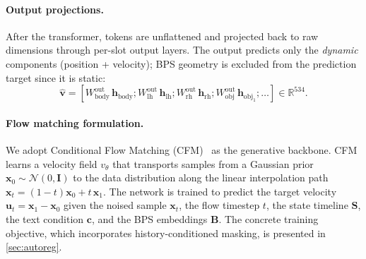 \documentclass[sigconf, screen, review, anonymous]{acmart}
\begin{document}
\paragraph{Output projections.}
After the transformer, tokens are unflattened and projected back to raw dimensions through per-slot output layers. The output predicts only the \emph{dynamic} components (position + velocity); BPS geometry is excluded from the prediction target since it is static:
\begin{equation}
    \hat{\mathbf{v}} = [W_{\text{body}}^{\text{out}}\,\mathbf{h}_{\text{body}}; W_{\text{lh}}^{\text{out}}\,\mathbf{h}_{\text{lh}}; W_{\text{rh}}^{\text{out}}\,\mathbf{h}_{\text{rh}}; W_{\text{obj}}^{\text{out}}\,\mathbf{h}_{\text{obj}_1}; \ldots] \in \mathbb{R}^{534}.
    \label{eq:output}
\end{equation}

\paragraph{Flow matching formulation.}
We adopt Conditional Flow Matching (CFM)~\cite{lipman2023flow} as the generative backbone. CFM learns a velocity field $v_\theta$ that transports samples from a Gaussian prior $\mathbf{x}_0 \sim \mathcal{N}(0, \mathbf{I})$ to the data distribution along the linear interpolation path $\mathbf{x}_t = (1{-}t)\mathbf{x}_0 + t\,\mathbf{x}_1$. The network is trained to predict the target velocity $\mathbf{u}_t = \mathbf{x}_1 - \mathbf{x}_0$ given the noised sample $\mathbf{x}_t$, the flow timestep $t$, the state timeline $\mathbf{S}$, the text condition $\mathbf{c}$, and the BPS embeddings $\mathbf{B}$. The concrete training objective, which incorporates history-conditioned masking, is presented in \cref{sec:autoreg}.
\end{document}

